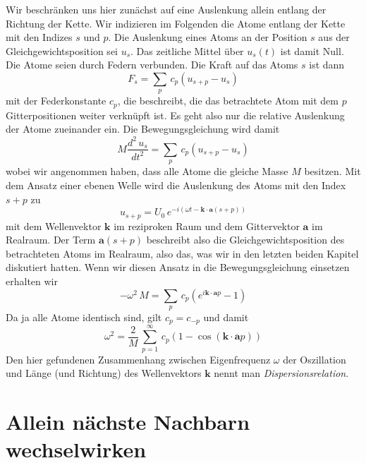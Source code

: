 Wir beschränken uns hier zunächst auf eine Auslenkung allein entlang der Richtung der Kette. Wir indizieren im Folgenden die Atome entlang der Kette mit den Indizes $s$ und $p$. Die Auslenkung eines Atoms an der Position $s$ aus der Gleichgewichtsposition sei $u_s$. 
Das zeitliche Mittel über $u_s(t)$ ist damit Null. Die Atome seien durch Federn verbunden. Die Kraft auf das Atoms $s$ ist dann
\begin{equation}
F_s = \sum_p \, c_p \left( u_{s+p} - u_s \right)
\end{equation}
mit der Federkonstante $c_p$, die beschreibt, die das betrachtete Atom mit dem $p$ Gitterpositionen weiter verknüpft ist. Es geht also nur die relative Auslenkung der Atome zueinander ein. Die Bewegungsgleichung wird damit
\begin{equation}
M \frac{d^2 \, u_s}{dt^2} = \sum_p \, c_p \left( u_{s+p} - u_s \right)
\end{equation}
wobei wir angenommen haben, dass alle Atome die gleiche Masse $M$ besitzen. Mit dem Ansatz einer ebenen Welle wird die Auslenkung des Atoms mit den Index $s+p$ zu
\begin{equation}
u_{s+p} = U_0 \, e^{-i ( \omega t - \mathbf{k} \cdot \mathbf{a} (s+p) )}
\end{equation}
mit dem Wellenvektor $\mathbf{k}$ im reziproken Raum und dem Gittervektor $\mathbf{a}$ im Realraum. Der Term $\mathbf{a} (s+p)$ beschreibt also die  Gleichgewichtsposition des betrachteten Atoms im Realraum, also das, was wir in den letzten beiden Kapitel diskutiert hatten. Wenn wir diesen Ansatz in die Bewegungsgleichung einsetzen erhalten wir
\begin{equation}
- \omega^2 \, M = \sum_p \, c_p \left( e^{i \mathbf{k} \cdot \mathbf{a} p} - 1 \right)
\end{equation}
Da ja alle Atome identisch sind, gilt $c_p = c_{-p}$ und damit
\begin{equation}
 \omega^2 =  \frac{2}{M} \, \sum_{p=1}^\infty \, c_p \left( 1 - \cos ( \mathbf{k} \cdot \mathbf{a} p ) \right)
\end{equation}
Den hier gefundenen Zusammenhang zwischen Eigenfrequenz $\omega$ der Oszillation und Länge (und Richtung) des Wellenvektors $\mathbf{k}$ nennt man \emph{Dispersionsrelation}.

\section{Allein nächste Nachbarn wechselwirken}

